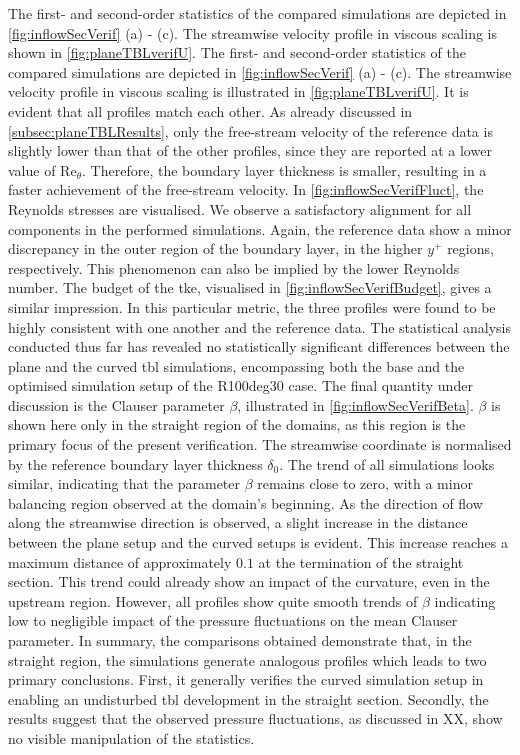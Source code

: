 The first- and second-order statistics of the compared simulations are depicted in \autoref{fig:inflowSecVerif} (a) - (c).
The streamwise velocity profile in viscous scaling is shown in \autoref{fig:planeTBLverifU}.
The first- and second-order statistics of the compared simulations are depicted in \autoref{fig:inflowSecVerif} (a) - (c).
The streamwise velocity profile in viscous scaling is illustrated  in \autoref{fig:planeTBLverifU}.
It is evident that all profiles match each other. 
As already discussed in \autoref{subsec:planeTBLResults}, only the free-stream velocity of the reference data is slightly lower than that of the other profiles, since they are reported at a lower value of $\mathrm{Re}_{\theta}$.
Therefore, the boundary layer thickness is smaller, resulting in a faster achievement of the free-stream velocity.
In \autoref{fig:inflowSecVerifFluct}, the Reynolds stresses are visualised. 
We observe a satisfactory alignment  for all components in the performed simulations.
Again, the reference data show a minor discrepancy in the outer region of the boundary layer, in the higher $y^+$ regions, respectively.
This phenomenon can also be implied by the lower Reynolds number.
The budget of the \acrshort{tke}, visualised in \autoref{fig:inflowSecVerifBudget}, gives a similar impression.
In this particular metric, the three profiles were found to be highly consistent with one another and the reference data.
The statistical analysis conducted thus far has revealed no statistically significant  differences between the plane and the curved \acrshort{tbl} simulations, encompassing both the base and the optimised simulation setup of the R100deg30 case.
The final quantity under discussion  is the Clauser parameter $\beta$, illustrated in \autoref{fig:inflowSecVerifBeta}.
$\beta$ is shown here only in the straight region of the domains, as this region is the primary focus of the present verification.
The streamwise coordinate is normalised by the reference boundary layer thickness $\delta_0$.
The trend of all simulations looks similar, indicating that the parameter  $\beta$ 
remains close to zero, with a minor balancing region observed at the domain's beginning. 
As the direction of flow along the streamwise direction is observed, a slight increase in the distance between the plane setup and the curved setups is evident. This increase reaches a maximum distance of approximately $0.1$ at the termination of the straight section.
This trend could already show an impact of the curvature, even in the upstream region.
However, all profiles show quite smooth trends of $\beta$ indicating low to negligible impact of the pressure fluctuations on the mean Clauser parameter.
In summary,  the comparisons obtained demonstrate that, in the straight region, the simulations generate analogous profiles  which leads to two primary conclusions.
First, it generally verifies the curved simulation setup in enabling an undisturbed \acrshort{tbl} development in the straight section.
Secondly, the results suggest that the observed pressure fluctuations, as discussed in XX, show no visible manipulation of the statistics.



